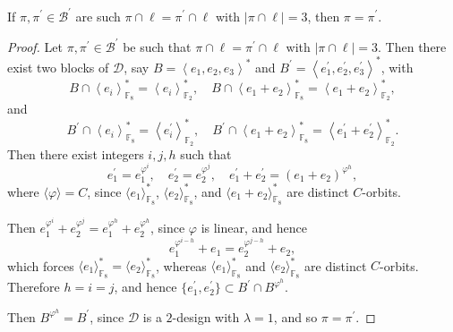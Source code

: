 \documentclass[10pt,a4paper]{amsart}
\begin{document}
\begin{lemma}
	\label{digest}If $\pi ,\pi ^{\prime }\in \mathcal{B}^{\prime }$ are such $%
	\pi \cap \ell =\pi ^{\prime }\cap \ell $ with $\lvert \pi \cap \ell
	\rvert =3$, then $\pi =\pi ^{\prime }$.
\end{lemma}

\begin{proof}
	
	Let $\pi , \pi ^{\prime } \in \mathcal{B}^{\prime }$ be such that $\pi \cap \ell = \pi ^{\prime } \cap \ell$ with $\lvert \pi \cap \ell \rvert = 3$. Then there exist two blocks of $\mathcal{D}$, say $B = \left\langle e_{1}, e_{2}, e_{3} \right\rangle^{\ast}$ and $B^{\prime} = \left\langle e_{1}^{\prime}, e_{2}^{\prime}, e_{3}^{\prime} \right\rangle^{\ast}$, with 
	\[
	B \cap \left\langle e_{i} \right\rangle_{\mathbb{F}_{8}}^{\ast} = \left\langle e_{i} \right\rangle_{\mathbb{F}_{2}}^{\ast}, \quad 
	B \cap \left\langle e_{1} + e_{2} \right\rangle_{\mathbb{F}_{8}}^{\ast} = \left\langle e_{1} + e_{2} \right\rangle_{\mathbb{F}_{2}}^{\ast},
	\]
	and 
	\[
	B^{\prime} \cap \left\langle e_{i} \right\rangle_{\mathbb{F}_{8}}^{\ast} = \left\langle e_{i}^{\prime} \right\rangle_{\mathbb{F}_{2}}^{\ast}, \quad 
	B^{\prime} \cap \left\langle e_{1} + e_{2} \right\rangle_{\mathbb{F}_{8}}^{\ast} = \left\langle e_{1}^{\prime} + e_{2}^{\prime} \right\rangle_{\mathbb{F}_{2}}^{\ast}.
	\]
	Then there exist integers $i, j, h$ such that 
	\[
	e_{1}^{\prime} = e_{1}^{\varphi^{i}}, \quad 
	e_{2}^{\prime} = e_{2}^{\varphi^{j}}, \quad 
	e_{1}^{\prime} + e_{2}^{\prime} = (e_{1} + e_{2})^{\varphi^{h}},
	\]
	where $\langle \varphi \rangle = C$, since $\langle e_{1} \rangle_{\mathbb{F}_{8}}^{\ast}$, $\langle e_{2} \rangle_{\mathbb{F}_{8}}^{\ast}$, and $\langle e_{1} + e_{2} \rangle_{\mathbb{F}_{8}}^{\ast}$ are distinct $C$-orbits. 
	
	Then $e_{1}^{\varphi^{i}} + e_{2}^{\varphi^{j}} = e_{1}^{\varphi^{h}} + e_{2}^{\varphi^{h}}$, since $\varphi$ is linear, and hence 
	\[
	e_{1}^{\varphi^{i - h}} + e_{1} = e_{2}^{\varphi^{j - h}} + e_{2},
	\]
	which forces $\langle e_{1} \rangle_{\mathbb{F}_{8}}^{\ast} = \langle e_{2} \rangle_{\mathbb{F}_{8}}^{\ast}$, whereas $\langle e_{1} \rangle_{\mathbb{F}_{8}}^{\ast}$ and $\langle e_{2} \rangle_{\mathbb{F}_{8}}^{\ast}$ are distinct $C$-orbits. Therefore $h = i = j$, and hence $\{ e_{1}^{\prime}, e_{2}^{\prime} \} \subset B^{\prime} \cap B^{\varphi^{h}}$. 
	
	Then $B^{\varphi^{h}} = B^{\prime}$, since $\mathcal{D}$ is a $2$-design with $\lambda = 1$, and so $\pi = \pi^{\prime}$.

\end{proof}
\end{document}
